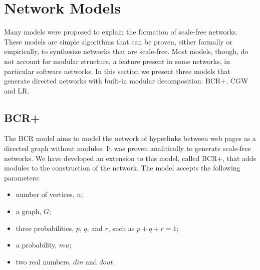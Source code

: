\section{Network Models}

Many models were proposed to explain the formation of scale-free networks. These
models are simple algorithms that can be proven, either formally or empirically,
to synthesize networks that are scale-free. Most models, though, do not account
for modular structure, a feature present in some networks, in particular
software networks. In this section we present three models that generate
directed networks with built-in modular decomposition: BCR+, CGW and LR. 




\subsection{BCR+}

The BCR model \cite{Bollobas2003} aims to model the network of hyperlinks
between web pages as a directed graph without modules. It was proven
analitically to generate scale-free networks. We have developed an extension to
this model, called BCR+, that adds modules to the construction of the network.
The model accepts the following parameters:

\begin{itemize}
\item number of vertices, $n$;
\item a graph, $G$;
\item three probabilities, $p$, $q$, and $r$, such as $p + q + r = 1$;
\item a probability, $mu$;
\item two real numbers, $din$ and $dout$.
\end{itemize}

